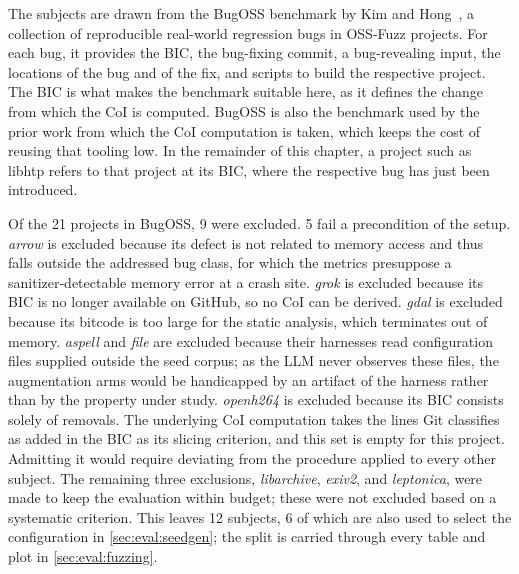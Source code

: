 The subjects are drawn from the BugOSS benchmark by Kim and Hong~\cite{kimBugOssBenchmarkRealworld2024}, a collection of reproducible real-world regression bugs in OSS-Fuzz projects.
For each bug, it provides the \ac{BIC}, the bug-fixing commit, a bug-revealing input, the locations of the bug and of the fix, and scripts to build the respective project.
The \ac{BIC} is what makes the benchmark suitable here, as it defines the change from which the \ac{CoI} is computed.
BugOSS is also the benchmark used by the prior work from which the \ac{CoI} computation is taken, which keeps the cost of reusing that tooling low.
In the remainder of this chapter, a project such as libhtp refers to that project at its \ac{BIC}, where the respective bug has just been introduced.

Of the \num{21} projects in BugOSS, \num{9} were excluded.
\num{5} fail a precondition of the setup.
\emph{arrow} is excluded because its defect is not related to memory access and thus falls outside the addressed bug class, for which the metrics presuppose a sanitizer-detectable memory error at a crash site.
\emph{grok} is excluded because its \ac{BIC} is no longer available on GitHub, so no \ac{CoI} can be derived.
\emph{gdal} is excluded because its bitcode is too large for the static analysis, which terminates out of memory.
\emph{aspell} and \emph{file} are excluded because their harnesses read configuration files supplied outside the seed corpus; as the \ac{LLM} never observes these files, the augmentation arms would be handicapped by an artifact of the harness rather than by the property under study.
\emph{openh264} is excluded because its \ac{BIC} consists solely of removals.
The underlying \ac{CoI} computation takes the lines Git classifies as added in the \ac{BIC} as its slicing criterion, and this set is empty for this project.
Admitting it would require deviating from the procedure applied to every other subject.
The remaining three exclusions, \emph{libarchive}, \emph{exiv2}, and \emph{leptonica}, were made to keep the evaluation within budget; these were not excluded based on a systematic criterion.
This leaves \num{12} subjects, \num{6} of which are also used to select the configuration in \autoref{sec:eval:seedgen}; the split is carried through every table and plot in \autoref{sec:eval:fuzzing}.



